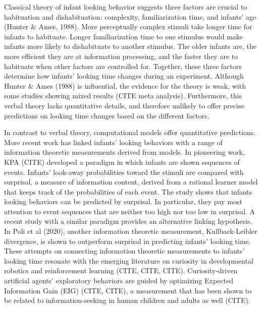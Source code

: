 \documentclass[10pt, letterpaper]{article}
\begin{document}
Classical theory of infant looking behavior suggests three factors are crucial to habituation and dishabituation: complexity, familiarization time, and infants' age (Hunter \& Ames, 1988). More perceptually complex stimuli take longer time for infants to habituate. Longer familiarization time to one stimulus would make infants more likely to dishabituate to another stimulus. The older infants are, the more efficient they are at information processing, and the faster they are to habituate when other factors are controlled for. Together, these three factors determine how infants' looking time changes during an experiment. Although Hunter \& Ames (1988) is influential, the evidence for the theory is weak, with some studies showing mixed results (CITE meta analysis). Furthermore, this verbal theory lacks quantitative details, and therefore unlikely to offer precise predictions on looking time changes based on the different factors.

In contrast to verbal theory, computational models offer quantitative predictions. More recent work has linked infants' looking behaviors with a range of information theoretic measurements derived from models. In pioneering work, KPA (CITE) developed a paradigm in which infants are shown sequences of events. Infants' look-away probabilities toward the stimuli are compared with surprisal, a measure of information content, derived from a rational learner model that keeps track of the probabilities of each event. The study shows that infants looking behaviors can be predicted by surprisal. In particular, they pay most attention to event sequences that are neither too high nor too low in surprisal. A recent study with a similar paradigm provides an alternative linking hypothesis. In Poli et al (2020), another information theoretic measurement, Kullback-Leibler divergence, is shown to outperform surprisal in predicting infants' looking time. These attempts on connecting information theoretic measurements to infants' looking time resonate with the emerging literature on curiosity in developmental robotics and reinforcement learning (CITE, CITE, CITE). Curiosity-driven artificial agents' exploratory behaviors are guided by optimizing Expected Information Gain (EIG) (CITE, CITE), a measurement that has been shown to be related to information-seeking in human children and adults as well (CITE).
\end{document}
